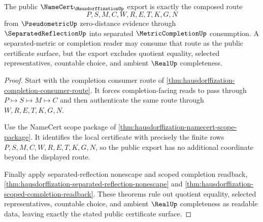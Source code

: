 \begin{theorem}
\label{thm:hausdorffization-public-export}
The public $\NameCert_{\HausdorffizationUp}$ export is exactly the composed route
$$
P,S,M,C,W,R,E,T,K,G,N
$$
from $\PseudometricUp$ zero-distance evidence through $\SeparatedReflectionUp$ into separated $\MetricCompletionUp$ consumption. A separated-metric or completion reader may consume that route as the public certificate surface, but the export excludes quotient equality, selected representatives, countable choice, and ambient $\RealUp$ completeness.
\end{theorem}
\begin{proof}
Start with the completion consumer route of \autoref{thm:hausdorffization-completion-consumer-route}. It forces completion-facing reads to pass through $P \longmapsto S \longmapsto M \longmapsto C$ and then authenticate the same route through $W,R,E,T,K,G,N$.

Use the NameCert scope package of \autoref{thm:hausdorffization-namecert-scope-package}. It identifies the local certificate with precisely the finite rows $P,S,M,C,W,R,E,T,K,G,N$, so the public export has no additional coordinate beyond the displayed route.

Finally apply separated-reflection nonescape and scoped completion readback, \autoref{thm:hausdorffization-separated-reflection-nonescape} and \autoref{thm:hausdorffization-scoped-completion-readback}. These theorems rule out quotient equality, selected representatives, countable choice, and ambient $\RealUp$ completeness as readable data, leaving exactly the stated public certificate surface.
\end{proof}

